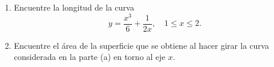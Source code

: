 \item 
    \begin{enumerate}
        \item[(a)] Encuentre la longitud de la curva 
        \[ y = \frac{x^3}{6} + \frac{1}{2x}, \quad 1 \le x \le 2. \]
        \item[(b)] Encuentre el área de la superficie que se obtiene al hacer girar la curva considerada en la parte (a) en torno al eje $x$.
    \end{enumerate}
